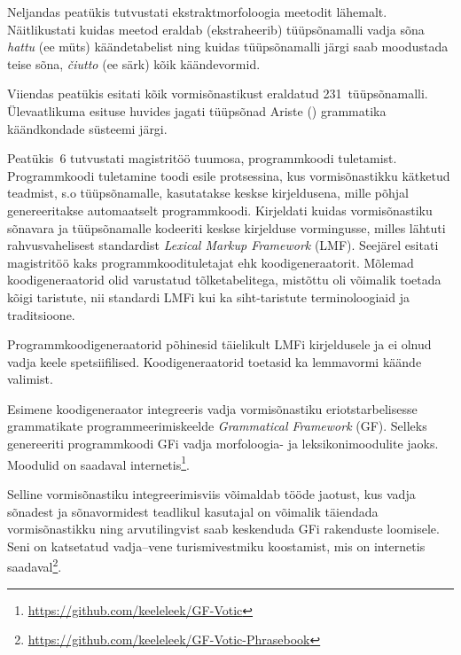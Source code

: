 \documentclass[12pt,a4paper]{article}
\newcommand{\vadja}[1]{\textit{#1}}
\begin{document}
Neljandas peatükis tutvustati ekstrakt\-morfoloogia meetodit lähemalt. Näitlikustati kuidas meetod eraldab (ekstraheerib) tüüpsõna\-malli vadja sõna \vadja{hattu} (ee müts) käände\-tabelist ning kuidas tüüpsõna\-malli järgi saab moodustada teise sõna, \vadja{čiutto} (ee särk) kõik käände\-vormid. %

Viiendas peatükis esitati kõik vormisõnastikust eraldatud 231~tüüpsõna\-malli. Ülevaatlikuma esituse huvides jagati tüüpsõnad Ariste (\citeyear{ariste_grammar_1968}) grammatika käänd\-kondade süsteemi järgi. %

Peatükis~6 tutvustati magistritöö tuumosa, programm\-koodi tuletamist. Programm\-koodi tuletamine toodi esile protsessina, kus vormisõnastikku kätketud teadmist, s.o tüüpsõna\-malle, kasutatakse keskse kirjeldusena, mille põhjal genereeritakse automaatselt programm\-koodi. Kirjeldati kuidas vormi\-sõnastiku sõna\-vara ja tüüp\-sõna\-malle kodeeriti keskse kirjelduse vormingusse, milles lähtuti rahvus\-vahelisest standardist \textit{Lexical Markup Framework} (LMF). Seejärel esitati magistritöö kaks programm\-koodi\-tuletajat ehk koodi\-generaatorit. Mõlemad koodi\-generaatorid olid varustatud tõlke\-tabelitega, mistõttu  oli võimalik toetada kõigi taristute, nii standardi LMFi kui ka siht-taristute terminoloogiaid ja traditsioone. %

Programmkoodigeneraatorid põhinesid täielikult LMFi kirjeldusele ja ei olnud vadja keele spetsiifilised. Koodi\-generaatorid toetasid ka lemma\-vormi käände valimist.

Esimene koodi\-generaator integreeris vadja vormi\-sõnastiku eri\-ots\-tarbelisesse grammatikate programmeerimis\-keelde \textit{Grammatical Framework} (GF). Selleks genereeriti programm\-koodi GFi vadja morfoloogia- ja leksikoni\-moodulite jaoks. Moodulid on saadaval internetis\footnote{\url{https://github.com/keeleleek/GF-Votic}}.

Selline vormisõnastiku integreerimis\-viis võimaldab tööde jaotust, kus vadja sõnadest ja sõna\-vormidest teadlikul kasutajal on võimalik täiendada vormisõnas\-tikku ning arvuti\-lingvist saab keskenduda GFi rakenduste loomisele. Seni on katsetatud vadja--vene turismi\-vestmiku koostamist, mis on internetis saadaval\footnote{\url{https://github.com/keeleleek/GF-Votic-Phrasebook}}.
\end{document}
